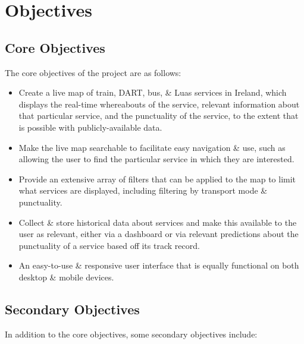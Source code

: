 \documentclass[a4paper,11pt]{report}
\begin{document}
\section{Objectives}
\subsection{Core Objectives}
The core objectives of the project are as follows:
\begin{itemize}
    \item   Create a live map of train, DART, bus, \& Luas services in Ireland, which displays the real-time whereabouts of the service, relevant information about that particular service, and the punctuality of the service, to the extent that is possible with publicly-available data.
    \item   Make the live map searchable to facilitate easy navigation \& use, such as allowing the user to find the particular service in which they are interested.
    \item   Provide an extensive array of filters that can be applied to the map to limit what services are displayed, including filtering by transport mode \& punctuality.
    \item   Collect \& store historical data about services and make this available to the user as relevant, either via a dashboard or via relevant predictions about the punctuality of a service based off its track record.
    \item   An easy-to-use \& responsive user interface that is equally functional on both desktop \& mobile devices.
\end{itemize}

\subsection{Secondary Objectives}
In addition to the core objectives, some secondary objectives include:
\end{document}
